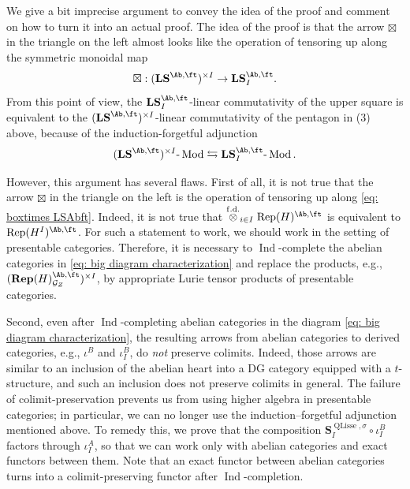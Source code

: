 \documentclass[10pt]{amsart}
\theoremstyle{remark}
\newcommand{\on}{\operatorname}
\newcommand{\cG}{\mathcal{G}}
\newcommand{\lMod}{\text{-}\on{Mod}}
\newcommand{\Rep}{\on{Rep}}
\newcommand{\QLisse}{\on{QLisse}}
\DeclareMathOperator{\Ind}{Ind}
\newcommand{\Ectens}{\stackrel{\on{f.d.}}{\otimes}}
\begin{document}
We give a bit imprecise argument to convey the idea of the proof and comment on how to turn it into an actual proof. The idea of the proof is that the arrow $\boxtimes$ in the triangle on the left almost looks like the operation of tensoring up along the symmetric monoidal map
\begin{equation}\label{eq: boxtimes LSAbft}
    \boxtimes:(\mathbf{LS}^{\Ab,\ft})^{\times I}\rightarrow \mathbf{LS}^{\Ab,\ft}_I.
\end{equation}
From this point of view, the $\mathbf{LS}^{\Ab,\ft}_I$-linear commutativity of the upper square is equivalent to the $(\mathbf{LS}^{\Ab,\ft})^{\times I}$-linear commutativity of the pentagon in (3) above, because of the induction-forgetful adjunction
\begin{equation}\label{eq: induction forgetful adj}
(\mathbf{LS}^{\Ab,\ft})^{\times I}\lMod\leftrightarrows \mathbf{LS}^{\Ab,\ft}_I\lMod.
\end{equation}

However, this argument has several flaws. First of all, it is not true that the arrow $\boxtimes$ in the triangle on the left is the operation of tensoring up along \eqref{eq: boxtimes LSAbft}. Indeed, it is not true that $\Ectens_{i\in I}\Rep(H)^{\Ab,\ft}$ is equivalent to $\Rep(H^I)^{\Ab,\ft}$. For such a statement to work, we should work in the setting of presentable categories. Therefore, it is necessary to $\Ind$-complete the abelian categories in \eqref{eq: big diagram characterization} and replace the products, e.g., $(\mathbf
{Rep}(H)^{\Ab,\ft}_{\cG_Z})^{\times I}$, by appropriate Lurie tensor products of presentable categories.

\medskip
Second, even after $\Ind$-completing abelian categories in the diagram \eqref{eq: big diagram characterization}, the resulting arrows from abelian categories to derived categories, e.g., $\iota^B$ and $\iota^B_I$, do \emph{not} preserve colimits. Indeed, those arrows are similar to an inclusion of the abelian heart into a DG category equipped with a $t$-structure, and such an inclusion does not preserve colimits in general. The failure of colimit-preservation prevents us from using higher algebra in presentable categories; in particular, we can no longer use the induction–forgetful adjunction mentioned above. To remedy this, we prove that the composition $\mathbf{S}^{\QLisse,\sigma}_I\circ \iota^B_I$ factors through $\iota^A_I$, so that we can work only with abelian categories and exact functors between them. Note that an exact functor between abelian categories turns into a colimit-preserving functor after $\Ind$-completion. 
\end{document}
